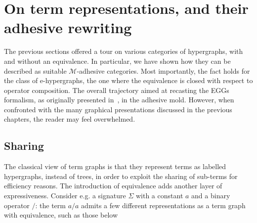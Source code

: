\documentclass[3p]{elsarticle}
\theoremstyle{remark}
\theoremstyle{definition}
\begin{document}
\section{On term representations, and their adhesive rewriting}
\label{rewriting}
The previous sections offered a tour on various categories of hypergraphs,
with and without an equivalence. 
In particular, we have shown how they 
can be described as suitable $\mathcal{M}$-adhesive categories.
%
%
Most importantly, the fact holds for the class of e-hypergraphs, the one 
where the equivalence is closed with respect to operator composition.
%
The overall trajectory aimed at recasting the EGGs formalism, 
as originally presented in~\cite{WillseyNWFTP21}, in the adhesive mold.
%
However, when confronted with the many graphical presentations discussed 
in the previous chapters, the reader may feel overwhelmed.

\subsection{Sharing} 
The classical view of term graphs is that they represent terms as labelled hypergraphs, instead of trees, in order to
exploit the sharing of sub-terms for efficiency reasons. The introduction of equivalence adds another layer of
expressiveness.
%
%
Consider e.g. a signature $\Sigma$ with a constant $a$ and a binary operator $/$: the term $a / a$ admits a few different 
representations as a term graph with equivalence, such as those below

%
\end{document}
